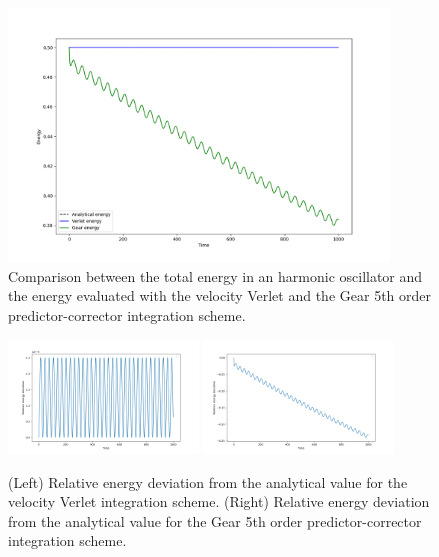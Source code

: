 \begin{figure}[H]
    \centering
    \includegraphics[width=0.9\textwidth]{FIG/ex9/energy_comparison.png}
    \caption{Comparison between the total energy in an harmonic oscillator and the energy evaluated with the velocity Verlet and the Gear 5th order predictor-corrector integration scheme.}
    \label{ex9:energy_comparison}
\end{figure}

\begin{figure}[H]
    \centering
    \includegraphics[width=0.45\textwidth]{FIG/ex9/verlet_energy_dev.png}
    \hspace{0.05\textwidth} %
    \includegraphics[width=0.45\textwidth]{FIG/ex9/gear_energy_dev.png}
    \caption{(Left) Relative energy deviation from the analytical value for the velocity Verlet integration scheme. (Right) Relative energy deviation from the analytical value for the Gear 5th order predictor-corrector integration scheme.}
    \label{fig:side_by_side}
\end{figure}

